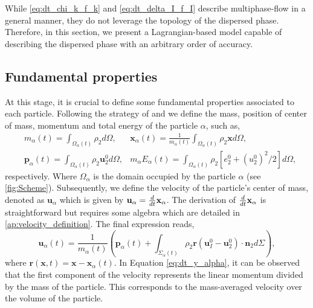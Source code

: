 
While \ref{eq:dt_chi_k_f_k} and \ref{eq:dt_delta_I_f_I} describe multiphase-flow in a general manner, they do not leverage the topology of the dispersed phase. 
Therefore, in this section, we present a Lagrangian-based model capable of describing the dispersed phase with an arbitrary order of accuracy.

\subsection{Fundamental properties}

At this stage, it is crucial to define some fundamental properties associated to each particle.
Following the strategy of \citet{lhuillier2009rheology,lhuillier1992volume,zaepffel2011modelisation} and \citet[Chapter 2]{morel2015mathematical}
we define the mass, position of center of mass, momentum and total energy of the particle $\alpha$, such as,
\begin{align}
    &m_\alpha(t)
    = \int_{\Omega_\alpha(t)} \rho_2  d\Omega,
    &\textbf{x}_\alpha(t)
    = \frac{1}{m_\alpha(t) }\int_{\Omega_\alpha(t)} \rho_2 \textbf{x} d\Omega,\\
    &\textbf{p}_\alpha(t) 
    = \int_{\Omega_\alpha(t)} \rho_2 \textbf{u}_2^0 d\Omega,
    & m_\alpha E_\alpha(t) 
    = \int_{\Omega_\alpha(t)} \rho_2 [e_2^0 + (u_2^0)^2/2] d\Omega,
    \label{eq:position_and_momentum_def}
\end{align}
respectively. 
Where $\Omega_\alpha$ is the domain occupied by the particle $\alpha$ (see \ref{fig:Scheme}). 
Subsequently, we define the velocity of the particle's center of mass, denoted as $\textbf{u}_\alpha$ which is given by $\textbf{u}_\alpha = \frac{d}{d t} \textbf{x}_\alpha$. 
The derivation of $\frac{d}{d t} \textbf{x}_\alpha$ is straightforward but requires some algebra which are detailed in \ref{ap:velocity_definition}. 
The final expression reads,
\begin{equation}
    \textbf{u}_\alpha(t) = \frac{1}{m_\alpha(t)} \left(
        \textbf{p}_\alpha(t)
        +  \int_{\Sigma_\alpha(t)} \rho_2 \textbf{r} (\textbf{u}_I^0 - \textbf{u}_2^0)\cdot \textbf{n}_2 d\Sigma
        \right),
        \label{eq:dt_y_alpha}
\end{equation}
where $\textbf{r}(\textbf{x},t) = \textbf{x} - \textbf{x}_\alpha(t)$. 
In Equation \ref{eq:dt_y_alpha}, it can be observed that the first component of the velocity represents the linear momentum divided by the mass of the particle. 
This corresponds to the mass-averaged velocity over the volume of the particle.
